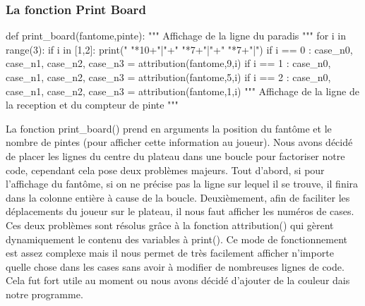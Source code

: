 \documentclass[titlepage]{report}
\begin{document}
\subsubsection{La fonction Print Board}
\begin{python}
def print_board(fantome,pinte):
    """ Affichage de la ligne du paradis """
    for i in range(3):
        if i in [1,2]:
            print(" "*10+"|"+" "*7+"|"+" "*7+"|")
        if i == 0 :
            case_n0, case_n1, case_n2, case_n3 = attribution(fantome,9,i)
        if i == 1 :
            case_n0, case_n1, case_n2, case_n3 = attribution(fantome,5,i)
        if i == 2 :
            case_n0, case_n1, case_n2, case_n3 = attribution(fantome,1,i)    
     """ Affichage de la ligne de la reception et du compteur de pinte """
\end{python}
\vspace*{0.5cm}
\hspace*{0.5cm}La fonction print\_board() prend en arguments la position du fantôme et le nombre de pintes (pour afficher cette information au joueur). Nous avons décidé de placer les lignes du centre du plateau dans une boucle pour factoriser notre code, cependant cela pose deux problèmes majeurs. Tout d'abord, si pour l'affichage du fantôme, si on ne précise pas la ligne sur lequel il se trouve, il finira dans la colonne entière à cause de la boucle. Deuxièmement, afin de faciliter les déplacements du joueur sur le plateau, il nous faut afficher les numéros de cases.\\
\hspace*{0.5cm}Ces deux problèmes sont résolus grâce à la fonction attribution() qui gèrent dynamiquement le contenu des variables à print(). Ce mode de fonctionnement est assez complexe mais il nous permet de très facilement afficher n'importe quelle chose dans les cases sans avoir à modifier de nombreuses lignes de code. Cela fut fort utile au moment ou nous avons décidé d'ajouter de la couleur dais notre programme. 
\vspace*{0.3cm}
\end{document}
